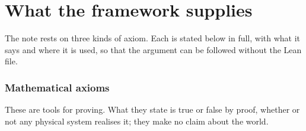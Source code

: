 \documentclass[11pt,reqno]{amsart}
\numberwithin{equation}{section}
\theoremstyle{remark}
\begin{document}
\section{What the framework supplies}\label{sec:inputs}

The note rests on three kinds of axiom. Each is stated below in full, with what it says and
where it is used, so that the argument can be followed without the Lean file.

\subsubsection*{Mathematical axioms}

These are tools for proving. What they state is true or false by proof, whether or not any
physical system realises it; they make no claim about the world.
\end{document}
